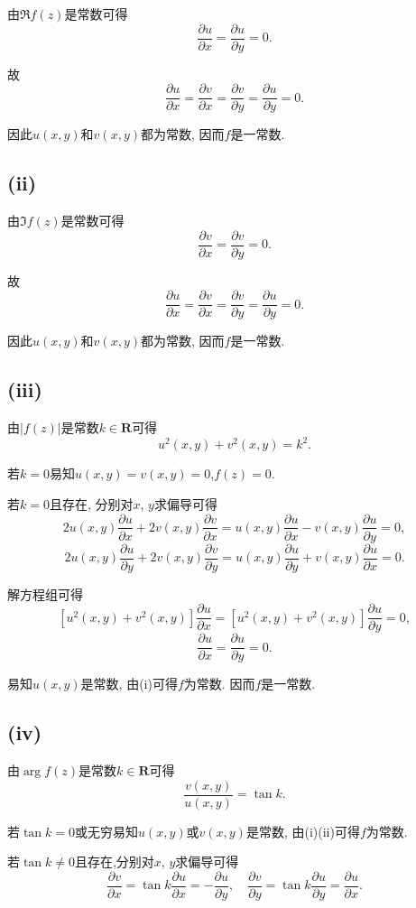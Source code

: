\documentclass[11pt,a4paper]{article}
\begin{document}
由$\Re f(z)$是常数可得
$$\frac{\partial u}{\partial x}=\frac{\partial u}{\partial y}=0.$$

故
$$\frac{\partial u}{\partial x}=\frac{\partial v}{\partial x}=\frac{\partial v}{\partial y}=\frac{\partial u}{\partial y}=0.$$

因此$u(x,y)$和$v(x,y)$都为常数, 因而$f$是一常数.

\subsection*{(ii)}

由$\Im f(z)$是常数可得
$$\frac{\partial v}{\partial x}=\frac{\partial v}{\partial y}=0.$$

故
$$\frac{\partial u}{\partial x}=\frac{\partial v}{\partial x}=\frac{\partial v}{\partial y}=\frac{\partial u}{\partial y}=0.$$

因此$u(x,y)$和$v(x,y)$都为常数, 因而$f$是一常数.

\subsection*{(iii)}

由$|f(z)|$是常数$k\in\mathbf{R}$可得
$$u^2(x,y)+v^2(x,y)=k^2.$$

若$k=0$易知$u(x,y)=v(x,y)=0$,$f(z)=0$.

若$k=0$且存在, 分别对$x$, $y$求偏导可得
$$2u(x,y)\frac{\partial u}{\partial x}+2v(x,y)\frac{\partial v}{\partial x}=u(x,y)\frac{\partial u}{\partial x}-v(x,y)\frac{\partial u}{\partial y}=0,$$
$$2u(x,y)\frac{\partial u}{\partial y}+2v(x,y)\frac{\partial v}{\partial y}=u(x,y)\frac{\partial u}{\partial y}+v(x,y)\frac{\partial u}{\partial x}=0.$$

解方程组可得
$$\left[u^2(x,y)+v^2(x,y)\right]\frac{\partial u}{\partial x}=\left[u^2(x,y)+v^2(x,y)\right]\frac{\partial u}{\partial y}=0,$$
$$\frac{\partial u}{\partial x}=\frac{\partial u}{\partial y}=0.$$

易知$u(x,y)$是常数, 由(i)可得$f$为常数. 因而$f$是一常数.

\subsection*{(iv)}

由$\arg f(z)$是常数$k\in\mathbf{R}$可得
$$\frac{v(x,y)}{u(x,y)}=\tan k.$$

若$\tan k=0$或无穷易知$u(x,y)$或$v(x,y)$是常数, 由(i)(ii)可得$f$为常数.

若$\tan k\neq0$且存在,分别对$x$, $y$求偏导可得
$$\frac{\partial v}{\partial x}=\tan k\frac{\partial u}{\partial x}=-\frac{\partial u}{\partial y},\quad\frac{\partial v}{\partial y}=\tan k\frac{\partial u}{\partial y}=\frac{\partial u}{\partial x}.$$
\end{document}
